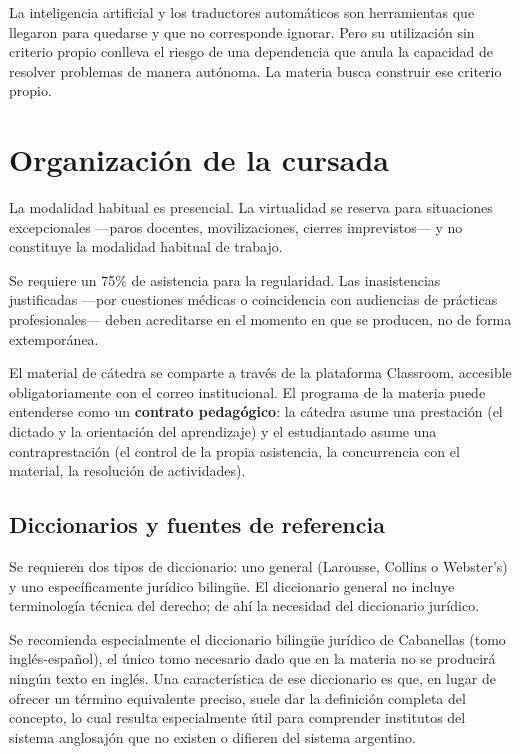 \documentclass[12pt,oneside]{book}
\begin{document}
\begin{important}
La inteligencia artificial y los traductores automáticos son herramientas que llegaron para quedarse y que no corresponde ignorar. Pero su utilización sin criterio propio conlleva el riesgo de una dependencia que anula la capacidad de resolver problemas de manera autónoma. La materia busca construir ese criterio propio.
\end{important}

\section{Organización de la cursada}

La modalidad habitual es presencial. La virtualidad se reserva para situaciones excepcionales ---paros docentes, movilizaciones, cierres imprevistos--- y no constituye la modalidad habitual de trabajo.

Se requiere un 75\% de asistencia para la regularidad. Las inasistencias justificadas ---por cuestiones médicas o coincidencia con audiencias de prácticas profesionales--- deben acreditarse en el momento en que se producen, no de forma extemporánea.

El material de cátedra se comparte a través de la plataforma Classroom, accesible obligatoriamente con el correo institucional. El programa de la materia puede entenderse como un \textbf{contrato pedagógico}: la cátedra asume una prestación (el dictado y la orientación del aprendizaje) y el estudiantado asume una contraprestación (el control de la propia asistencia, la concurrencia con el material, la resolución de actividades).

\subsection{Diccionarios y fuentes de referencia}

Se requieren dos tipos de diccionario: uno general (Larousse, Collins o Webster's) y uno específicamente jurídico bilingüe. El diccionario general no incluye terminología técnica del derecho; de ahí la necesidad del diccionario jurídico.

Se recomienda especialmente el diccionario bilingüe jurídico de Cabanellas (tomo inglés-español), el único tomo necesario dado que en la materia no se producirá ningún texto en inglés. Una característica de ese diccionario es que, en lugar de ofrecer un término equivalente preciso, suele dar la definición completa del concepto, lo cual resulta especialmente útil para comprender institutos del sistema anglosajón que no existen o difieren del sistema argentino.
\end{document}
